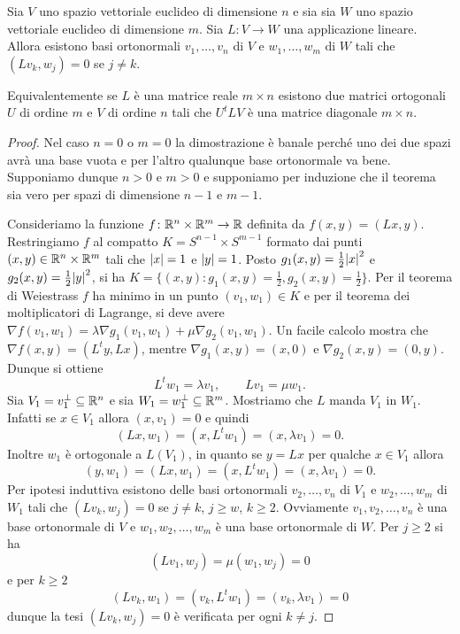 \begin{theorem}
  \label{th:decomposizione_singolare}
Sia $V$ uno spazio vettoriale euclideo di dimensione $n$ e sia
sia $W$ uno spazio vettoriale euclideo di dimensione $m$.
Sia $L\colon V\to W$ una applicazione lineare.
Allora esistono basi ortonormali $v_1,\dots,v_n$ di $V$ e 
$w_1,\dots,w_m$ di $W$ tali che $(L v_k,w_j) = 0$ se $j\neq k$.

Equivalentemente se $L$ è una matrice reale $m\times n$ esistono 
due matrici ortogonali $U$ di ordine $m$ e $V$ di ordine $n$ tali che
$ U^t L V$ è una matrice diagonale $m\times n$.
\end{theorem}

\begin{proof}
Nel caso $n=0$ o $m=0$ la dimostrazione è banale perché uno dei due spazi 
avrà una base vuota e per l'altro qualunque base ortonormale va bene. 
Supponiamo dunque $n>0$ e $m>0$ e supponiamo per induzione 
che il teorema sia vero per spazi di dimensione $n-1$ e $m-1$.

Consideriamo la funzione $f\colon {\mathbb R}^n\times {\mathbb R}^m \to {\mathbb R}$ definita da
$f(x,y) = (L x, y)$.
Restringiamo $f$ al compatto $K=S^{n-1}\times S^{m-1}$
formato dai punti $(x,y)\in{\mathbb R}^n\times {\mathbb R}^m$ tali che ${\left|x\right|} = 1$ e ${\left|y\right|} = 1$.
Posto $g_1(x,y) = \frac 1 2 {\left|x\right|}^2$ e $g_2(x,y) = \frac 1 2 {\left|y\right|}^2$,
si ha $K=\{(x,y) \colon g_1(x,y) = \frac 1 2, g_2(x,y) = \frac 1 2\}$.
Per il teorema di Weiestrass $f$ ha minimo in un punto $(v_1,w_1)\in K$ 
e per il teorema dei moltiplicatori di Lagrange, si deve avere
$\nabla f(v_1,w_1) = \lambda \nabla g_1(v_1,w_1) + \mu \nabla g_2(v_1,w_1)$.
Un facile calcolo mostra che $\nabla f(x,y) = (L^t y, L x)$,
mentre $\nabla g_1(x,y) = (x,0)$ e $\nabla g_2(x,y) = (0,y)$. 
Dunque si ottiene
\[
L^t w_1 = \lambda v_1, \qquad L v_1 = \mu w_1.
\]
Sia $V_1 = v_1^\perp \subseteq {\mathbb R}^n$ e sia $W_1 = w_1^\perp \subseteq {\mathbb R}^m$.
Mostriamo che $L$ manda $V_1$ in $W_1$. 
Infatti se $x\in V_1$ allora $(x,v_1) = 0$ e quindi
\[
(L x, w_1) = (x, L^t w_1) = (x, \lambda v_1) = 0.
\]
Inoltre $w_1$ è ortogonale a $L(V_1)$, in quanto 
se $y = L x$ per qualche $x\in V_1$ allora
\[
(y,w_1) = (L x, w_1) = (x, L^t w_1) = (x, \lambda v_1) = 0.
\]
Per ipotesi induttiva esistono delle basi ortonormali $v_2,\dots, v_n$ di $V_1$ 
e $w_2,\dots,w_m$ di $W_1$ tali che
$(L v_k, w_j) = 0$ se $j\neq k$, $j\ge w$, $k\ge 2$.
Ovviamente $v_1,v_2,\dots, v_n$ è una base ortonormale di $V$ e
$w_1,w_2,\dots,w_m$ è una base ortonormale di $W$.
Per $j\ge 2$ si ha 
\[   
  (L v_1, w_j) = \mu (w_1, w_j) = 0 
\]
e per $k\ge 2$ 
\[
  (L v_k, w_1) = (v_k, L^t w_1) = (v_k, \lambda v_1) = 0
\]
dunque la tesi $(L v_k, w_j) = 0$ è verificata per ogni $k\neq j$.
\end{proof}



